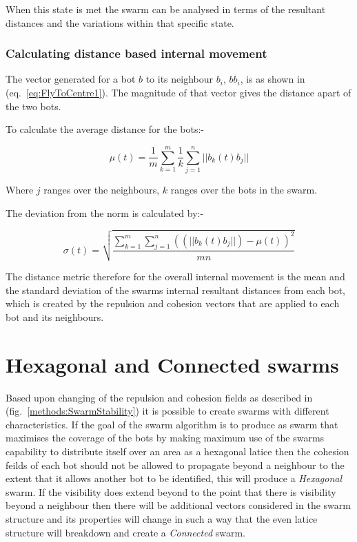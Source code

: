 \documentclass[10pt,journal,letterpaper,twoside]{IEEEtran}
\newcommand{\swarmA}{Hexagonal}
\newcommand{\swarmB}{Connected}
\newcommand{\stability}{internal movement}
\newcommand{\Fig}{fig.}
\newcommand{\Eq}{eq.}
\begin{document}
When this state is met the swarm can be analysed in terms of the resultant distances and the variations within that specific state.

\subsubsection{Calculating distance based \stability{}}

The vector generated for a bot $b$ to its neighbour $b_i$, $bb_i$, is as shown in (\Eq{}~\ref{eq:FlyToCentre1}). The magnitude of that vector gives the distance apart of the two bots.

To calculate the average distance for the bots:-

\begin{equation}
\label{eq:SwarmStabilityDistance1}
\mu(t) = \frac{1}{m}{\sum_{k=1}^{m}}\frac{1}{k}{\sum_{j=1}^{n}||b_k(t)b_j||}
\end{equation}

Where $j$ ranges over the neighbours, $k$ ranges over the bots in the swarm.

The deviation from the norm is calculated by:-

\begin{equation}
\label{eq:SwarmStabilityQuotientT}
\sigma(t) = \sqrt{\frac{\sum_{k=1}^{m}\sum_{j=1}^{n}((||b_k(t)b_j||)-\mu(t))^2}{mn}}
\end{equation}

The distance metric therefore for the overall \stability{} is the mean and the standard deviation of the swarms internal resultant distances from each bot, which is created by the repulsion and cohesion vectors that are applied to each bot and its neighbours.

\section{\swarmA{} and \swarmB{} swarms\label{methods:SwarmTypesStability1}}

Based upon changing of the repulsion and cohesion fields as described in (\Fig{}~\ref{methods:SwarmStability}) it is possible to create swarms with different characteristics. If the goal of the swarm algorithm is to produce as swarm that maximises the coverage of the bots by making maximum use of the swarms capability to distribute itself over an area as a hexagonal latice then the cohesion feilds of each bot should not be allowed to propagate beyond a neighbour to the extent that it allows another bot to be identified, this will produce a \textit{\swarmA{}} swarm. If the visibility does extend beyond to the point that there is visibility beyond a neighbour then there will be additional vectors considered in the swarm structure and its properties will change in such a way that the even latice structure will breakdown and create a \textit{\swarmB{}} swarm.
\end{document}
